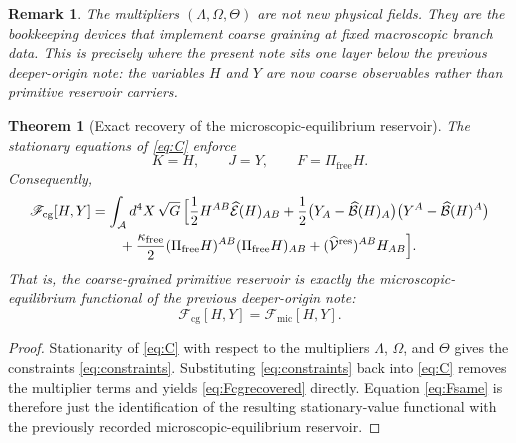 \documentclass[11pt]{article}
\newcommand{\Sub}{\mathcal A}
\newcommand{\ResidualLift}{\widehat{\mathcal V}^{\mathrm{res}}}
\newcommand{\SubEinLin}{\widehat{\mathcal E}}
\newcommand{\SubGaugeVec}{\widehat{\mathcal B}}
\newcommand{\FreeProj}{\Pi_{\mathrm{free}}}
\newcommand{\GaugeAux}{Y}
\newcommand{\MicFunctional}{\mathscr F_{\mathrm{mic}}}
\newcommand{\CoarseFunctional}{\mathscr F_{\mathrm{cg}}}
\newcommand{\FreeStiff}{\kappa_{\mathrm{free}}}
\newcommand{\PrimStrain}{K}
\newcommand{\PrimNeutral}{J}
\newcommand{\PrimFree}{F}
\newcommand{\StrainMult}{\Lambda}
\newcommand{\NeutralMult}{\Omega}
\newcommand{\FreeMult}{\Theta}
\newtheorem{remark}{Remark}
\newtheorem{theorem}{Theorem}
\begin{document}
\begin{remark}
The multipliers \((\StrainMult,\NeutralMult,\FreeMult)\) are not new physical fields. They are the bookkeeping devices that implement coarse graining at fixed macroscopic branch data. This is precisely where the present note sits one layer below the previous deeper-origin note: the variables \(H\) and \(\GaugeAux\) are now coarse observables rather than primitive reservoir carriers.
\end{remark}

\begin{theorem}[Exact recovery of the microscopic-equilibrium reservoir]
\label{thm:recover}
The stationary equations of \eqref{eq:C} enforce
\begin{equation}
\PrimStrain=H,
\qquad
\PrimNeutral=\GaugeAux,
\qquad
\PrimFree=\FreeProj H.
\label{eq:constraints}
\end{equation}
Consequently,
\begin{equation}
\begin{aligned}
\CoarseFunctional[H,\GaugeAux]
&=
\int_{\Sub} d^4X\,\sqrt{G}\,
\Bigl[
\frac12 H^{AB}\SubEinLin(H)_{AB}
 +\frac12\bigl(\GaugeAux_A-\SubGaugeVec(H)_A\bigr)
\bigl(\GaugeAux^A-\SubGaugeVec(H)^A\bigr)
\\
&\qquad
 +\frac{\FreeStiff}{2}(\FreeProj H)^{AB}(\FreeProj H)_{AB}
+(\ResidualLift)^{AB}H_{AB}
\Bigr].
\end{aligned}
\label{eq:Fcgrecovered}
\end{equation}
That is, the coarse-grained primitive reservoir is exactly the microscopic-equilibrium functional of the previous deeper-origin note:
\begin{equation}
\CoarseFunctional[H,\GaugeAux]=\MicFunctional[H,\GaugeAux].
\label{eq:Fsame}
\end{equation}
\end{theorem}

\begin{proof}
Stationarity of \eqref{eq:C} with respect to the multipliers \(\StrainMult\), \(\NeutralMult\), and \(\FreeMult\) gives the constraints \eqref{eq:constraints}. Substituting \eqref{eq:constraints} back into \eqref{eq:C} removes the multiplier terms and yields \eqref{eq:Fcgrecovered} directly. Equation \eqref{eq:Fsame} is therefore just the identification of the resulting stationary-value functional with the previously recorded microscopic-equilibrium reservoir.
\end{proof}
\end{document}
